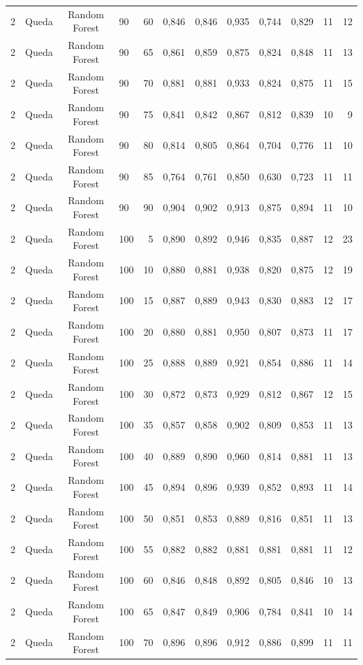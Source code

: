 \begin{longtable}{ccclrrrrrrrr}
2 & Queda & Random Forest & 90 & 60 & 0,846 & 0,846 & 0,935 & 0,744 & 0,829 & 11 & 12 \\
2 & Queda & Random Forest & 90 & 65 & 0,861 & 0,859 & 0,875 & 0,824 & 0,848 & 11 & 13 \\
2 & Queda & Random Forest & 90 & 70 & 0,881 & 0,881 & 0,933 & 0,824 & 0,875 & 11 & 15 \\
2 & Queda & Random Forest & 90 & 75 & 0,841 & 0,842 & 0,867 & 0,812 & 0,839 & 10 & 9 \\
2 & Queda & Random Forest & 90 & 80 & 0,814 & 0,805 & 0,864 & 0,704 & 0,776 & 11 & 10 \\
2 & Queda & Random Forest & 90 & 85 & 0,764 & 0,761 & 0,850 & 0,630 & 0,723 & 11 & 11 \\
2 & Queda & Random Forest & 90 & 90 & 0,904 & 0,902 & 0,913 & 0,875 & 0,894 & 11 & 10 \\
2 & Queda & Random Forest & 100 & 5 & 0,890 & 0,892 & 0,946 & 0,835 & 0,887 & 12 & 23 \\
2 & Queda & Random Forest & 100 & 10 & 0,880 & 0,881 & 0,938 & 0,820 & 0,875 & 12 & 19 \\
2 & Queda & Random Forest & 100 & 15 & 0,887 & 0,889 & 0,943 & 0,830 & 0,883 & 12 & 17 \\
2 & Queda & Random Forest & 100 & 20 & 0,880 & 0,881 & 0,950 & 0,807 & 0,873 & 11 & 17 \\
2 & Queda & Random Forest & 100 & 25 & 0,888 & 0,889 & 0,921 & 0,854 & 0,886 & 11 & 14 \\
2 & Queda & Random Forest & 100 & 30 & 0,872 & 0,873 & 0,929 & 0,812 & 0,867 & 12 & 15 \\
2 & Queda & Random Forest & 100 & 35 & 0,857 & 0,858 & 0,902 & 0,809 & 0,853 & 11 & 13 \\
2 & Queda & Random Forest & 100 & 40 & 0,889 & 0,890 & 0,960 & 0,814 & 0,881 & 11 & 13 \\
2 & Queda & Random Forest & 100 & 45 & 0,894 & 0,896 & 0,939 & 0,852 & 0,893 & 11 & 14 \\
2 & Queda & Random Forest & 100 & 50 & 0,851 & 0,853 & 0,889 & 0,816 & 0,851 & 11 & 13 \\
2 & Queda & Random Forest & 100 & 55 & 0,882 & 0,882 & 0,881 & 0,881 & 0,881 & 11 & 12 \\
2 & Queda & Random Forest & 100 & 60 & 0,846 & 0,848 & 0,892 & 0,805 & 0,846 & 10 & 13 \\
2 & Queda & Random Forest & 100 & 65 & 0,847 & 0,849 & 0,906 & 0,784 & 0,841 & 10 & 14 \\
2 & Queda & Random Forest & 100 & 70 & 0,896 & 0,896 & 0,912 & 0,886 & 0,899 & 11 & 11 \\

\end{longtable}
